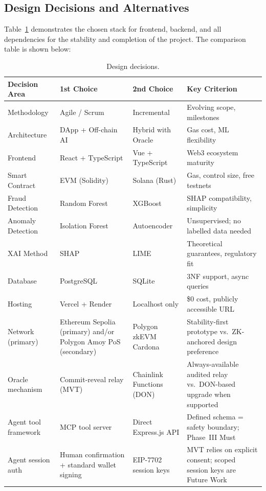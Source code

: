 \documentclass[12pt,a4paper]{report}
\newcommand{\tableheadcolor}{\rowcolor{TableHeadBg}}
\begin{document}
\subsection{Design Decisions and Alternatives}

Table~\ref{tab:design-decisions} demonstrates the chosen stack for frontend, backend, and all dependencies for the stability and completion of the project. The comparison table is shown below:

\begin{table}[H]
\centering
\caption[Design decisions]{Design decisions.}
\label{tab:design-decisions}
\begin{tabular}{p{3cm}p{3cm}p{3cm}p{4.5cm}}
\toprule
\tableheadcolor
\textbf{Decision Area} & \textbf{1st Choice} & \textbf{2nd Choice} & \textbf{Key Criterion} \\
\midrule
Methodology & Agile / Scrum & Incremental & Evolving scope, milestones \\
Architecture & DApp + Off-chain AI & Hybrid with Oracle & Gas cost, ML flexibility \\
Frontend & React + TypeScript & Vue + TypeScript & Web3 ecosystem maturity \\
Smart Contract & EVM (Solidity) & Solana (Rust) & Gas, control size, free testnets \\
Fraud Detection & Random Forest & XGBoost & SHAP compatibility, simplicity \\
Anomaly Detection & Isolation Forest & Autoencoder & Unsupervised; no labelled data needed \\
XAI Method & SHAP & LIME & Theoretical guarantees, regulatory fit \\
Database & PostgreSQL & SQLite & 3NF support, async queries \\
Hosting & Vercel + Render & Localhost only & \$0 cost, publicly accessible URL \\
Network (primary) & Ethereum Sepolia (primary) and/or Polygon Amoy PoS (secondary) & Polygon zkEVM Cardona & Stability-first prototype vs.\ ZK-anchored design preference \\
Oracle mechanism & Commit-reveal relay (MVT) & Chainlink Functions (DON) & Always-available audited relay vs.\ DON-based upgrade when supported \\
Agent tool framework & MCP tool server & Direct Express.js API & Defined schema = safety boundary; Phase~III Must \\
Agent session auth & Human confirmation + standard wallet signing & EIP-7702 session keys & MVT relies on explicit consent; scoped session keys are Future Work \\

\end{tabular}
\end{table}
\end{document}

